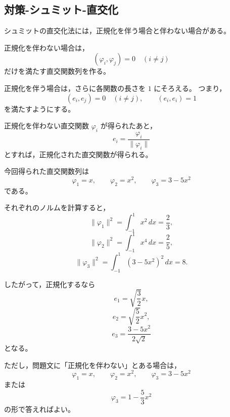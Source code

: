 \subsection{対策-シュミット-直交化}
\begin{background}
	シュミットの直交化法には，正規化を伴う場合と伴わない場合がある。
	
	正規化を伴わない場合は，
	\[
	(\varphi_i,\varphi_j)=0\quad (i\neq j)
	\]
	だけを満たす直交関数列を作る。
	
	正規化を伴う場合は，さらに各関数の長さを \(1\) にそろえる。
	つまり，
	\[
	(e_i,e_j)=0\quad (i\neq j),
	\qquad
	(e_i,e_i)=1
	\]
	を満たすようにする。
	
	正規化を伴わない直交関数 \(\varphi_i\) が得られたあと，
	\[
	e_i=\frac{\varphi_i}{\|\varphi_i\|}
	\]
	とすれば，正規化された直交関数が得られる。
\end{background}

\begin{strategy}
	今回得られた直交関数列は
	\[
	\varphi_1=x,\qquad
	\varphi_2=x^2,\qquad
	\varphi_3=3-5x^2
	\]
	である。
	
	それぞれのノルムを計算すると，
	\[
	\|\varphi_1\|^2
	=
	\int_{-1}^{1}x^2\,dx
	=
	\frac{2}{3},
	\]
	\[
	\|\varphi_2\|^2
	=
	\int_{-1}^{1}x^4\,dx
	=
	\frac{2}{5},
	\]
	\[
	\|\varphi_3\|^2
	=
	\int_{-1}^{1}(3-5x^2)^2\,dx
	=
	8.
	\]
	
	したがって，正規化するなら
	\[
	e_1=\sqrt{\frac{3}{2}}x,
	\]
	\[
	e_2=\sqrt{\frac{5}{2}}x^2,
	\]
	\[
	e_3=\frac{3-5x^2}{2\sqrt{2}}
	\]
	となる。
	
	ただし，問題文に「正規化を伴わない」とある場合は，
	\[
	\varphi_1=x,\qquad
	\varphi_2=x^2,\qquad
	\varphi_3=3-5x^2
	\]
	または
	\[
	\varphi_3=1-\frac{5}{3}x^2
	\]
	の形で答えればよい。
\end{strategy}